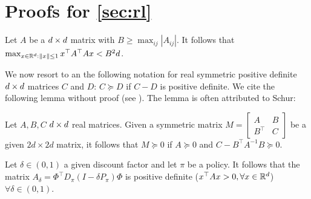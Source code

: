 \section{Proofs for \cref{sec:rl}}

\begin{lemma}\label{lm:matnorm}
Let $A$ be a $d \times d$ matrix with $B\ge \max_{ij}\left|A_{ij}\right|$. It follows that $\max_{x\in \mathbb{R}^d: \left\| x\right\|\leq1}x^\top A^\top A x <B^2d$.
\end{lemma}

We now resort to an the following notation for real symmetric positive definite $d \times d$ matrices $C$ and $D$: $C\succeq D$ if $C-D$ is positive definite. We cite the following lemma without proof (see \cite{schur}). The lemma is often attributed to Schur: 
\begin{lemma}\label{lm:schur}
Let $A,B,C$ $d \times d$ real matrices. Given a symmetric matrix $M=\left[\begin{matrix}A&B \\B^\top &C\end{matrix}\right]$ be a given $2d\times 2d$ matrix, it follows that $M\succeq 0$ if	$A\succeq 0$ and $C-B^\top A^{-1}B\succeq 0$.
\end{lemma}
\begin{lemma}\label{lm:amat}
Let $\delta\in(0,1)$ a given discount factor and let $\pi$ be a policy. It follows that the matrix $A_\delta=\Phi^\top D_\pi(I-\delta P_\pi)\Phi$ is positive definite ($x^\top Ax>0,\forall x \in \mathbb{R}^d$) $\forall \delta\in(0,1)$.
\end{lemma}
\fi

